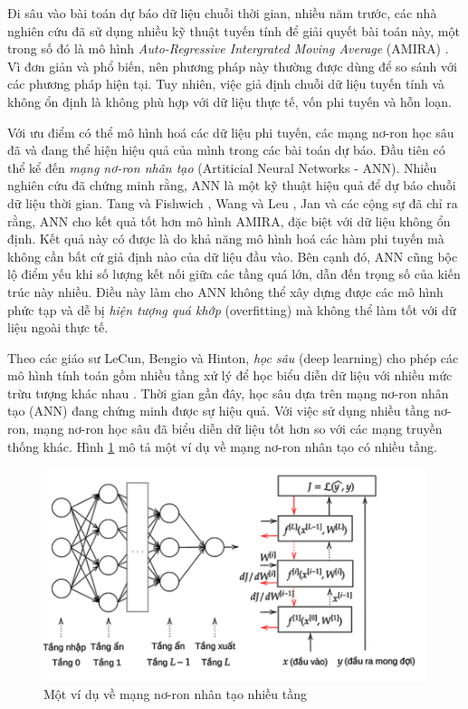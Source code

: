 Đi sâu vào bài toán dự báo dữ liệu chuỗi thời gian, nhiều năm trước, các nhà nghiên cứu đã sử dụng nhiều kỹ thuật tuyến tính để giải quyết bài toán này, một trong số đó là mô hình \textit{Auto-Regressive Intergrated Moving Average} (AMIRA) \cite{st6}. Vì đơn giản và phổ biến, nên phương pháp này thường được dùng để so sánh với các phương pháp hiện tại. Tuy nhiên, việc giả định chuỗi dữ liệu tuyến tính và không ổn định là không phù hợp với dữ liệu thực tế, vốn phi tuyến và hỗn loạn.

Với ưu điểm có thể mô hình hoá các dữ liệu phi tuyến, các mạng nơ-ron học sâu đã và đang thể hiện hiệu quả của mình trong các bài toán dự báo. Đầu tiên có thể kể đến \textit{mạng nơ-ron nhân tạo} (Artiticial Neural Networks - ANN). Nhiều nghiên cứu đã chứng minh rằng, ANN là một kỹ thuật hiệu quả để dự báo chuỗi dữ liệu thời gian. Tang và Fishwich \cite{st7fix}, Wang và Leu \cite{st8}, Jan và các cộng sự \cite{st9} đã chỉ ra rằng, ANN cho kết quả tốt hơn mô hình AMIRA, đặc biệt với dữ liệu không ổn định. Kết quả này có được là do khả năng mô hình hoá các hàm phi tuyến mà không cần bất cứ giả định nào của dữ liệu đầu vào. Bên cạnh đó, ANN cũng bộc lộ điểm yếu khi số lượng kết nối giữa các tầng quá lớn, dẫn đến trọng số của kiến trúc này nhiều. Điều này làm cho ANN không thể xây dựng được các mô hình phức tạp và dễ bị \textit{hiện tượng quá khớp} (overfitting) mà không thể làm tốt với dữ liệu ngoài thực tế.

Theo các giáo sư LeCun, Bengio và Hinton, \textit{học sâu} (deep learning) cho phép các mô hình tính toán gồm nhiều tầng xử lý để học biểu diễn dữ liệu với nhiều mức trừu tượng khác nhau \cite{st24}. Thời gian gần đây, học sâu dựa trên mạng nơ-ron nhân tạo (ANN) đang chứng minh được sự hiệu quả. Với việc sử dụng nhiều tầng nơ-ron, mạng nơ-ron học sâu đã biểu diễn dữ liệu tốt hơn so với các mạng truyền thống khác. Hình \ref{fig:1-2} mô tả một ví dụ về mạng nơ-ron nhân tạo có nhiều tầng.

\begin{figure}[H]
    \centering
    \includegraphics[scale=0.95]{./content/images/1-2.png}
    \caption{Một ví dụ về mạng nơ-ron nhân tạo nhiều tầng}
    \label{fig:1-2}
\end{figure}


